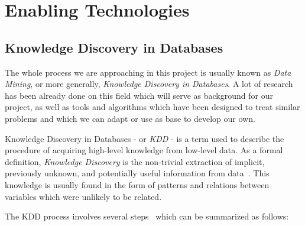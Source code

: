 \chapter{Enabling Technologies}
\label{chap:enabling_technologies}
\section{Knowledge Discovery in Databases}
The whole process we are approaching in this project is usually known as \emph{Data Mining}, or more generally, \emph{Knowledge Discovery in Databases}. A lot of research has been already done on this field which will serve as background for our project, as well as tools and algorithms which have been designed to treat similar problems and which we can adapt or use as base to develop our own\cite{chen1996data, fayyad1996kdd}.

Knowledge Discovery in Databases - or \emph{KDD} - is a term used to describe the procedure of acquiring high-level knowledge from low-level data. As a formal definition, \emph{Knowledge Discovery} is the non-trivial extraction of implicit, previously unknown, and potentially useful information from data~\cite{frawley1992knowledge}. This knowledge is usually found in the form of patterns and relations between variables which were unlikely to be related.

The KDD process involves several steps~\cite{feyyad1996data} which can be summarized as follows:

